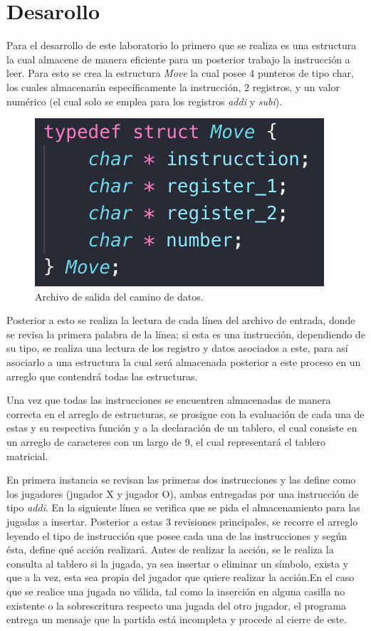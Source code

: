 \section{Desarollo}

\noindent Para el desarrollo de este laboratorio lo primero que se realiza es una estructura la cual almacene de manera eficiente para un posterior trabajo la instrucción a leer. Para esto se crea la estructura \textit{Move} la cual posee 4 punteros de tipo char, los cuales almacenarán específicamente la instrucción, 2 registros, y un valor numérico (el cual solo se emplea para los registros \textit{addi} y \textit{subi}).

\begin{figure}[H]
	\centering
	\includegraphics[scale=1]{images/estructura.png}
	\caption{Archivo de salida del camino de datos.}
	\label{fig:estructura}
\end{figure}

\noindent Posterior a esto se realiza la lectura de cada línea del archivo de entrada, donde se revisa la primera palabra de la línea; si esta es una instrucción, dependiendo de su tipo, se realiza una lectura de los registro y datos asociados a este, para así asociarlo a una estructura la cual será almacenada posterior a este proceso en un arreglo que contendrá todas las estructuras.

\noindent Una vez que todas las instrucciones se encuentren almacenadas de manera correcta en el arreglo de estructuras, se prosigue con la evaluación de cada una de estas y su respectiva función y a la declaración de un tablero, el cual consiste en un arreglo de caracteres con un largo de 9, el cual representará el tablero matricial.

\noindent En primera instancia se revisan las primeras dos instrucciones y las define como los jugadores (jugador X y jugador O), ambas entregadas por una instrucción de tipo \textit{addi}. En la siguiente línea se verifica que se pida el almacenamiento para las jugadas a insertar. Posterior a estas 3 revisiones principales, se recorre el arreglo leyendo el tipo de instrucción que posee cada una de las instrucciones y según ésta, define qué acción realizará. Antes de realizar la acción, se le realiza la consulta al tablero si la jugada, ya sea insertar o eliminar un símbolo, exista y que a la vez, esta sea propia del jugador que quiere realizar la acción.En el caso que se realice una jugada no válida, tal como la inserción en alguna casilla no existente o la sobrescritura respecto una jugada del otro jugador, el programa entrega un mensaje que la partida está incompleta y procede al cierre de este.

